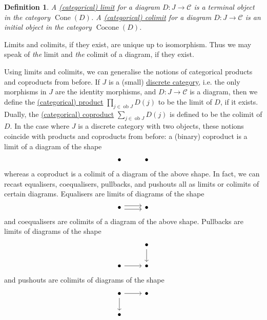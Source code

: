 \documentclass[a4paper,11pt]{article}
\theoremstyle{break_italics}
\newtheorem*{definition*}{Definition}
\theoremstyle{break_upright}
\theoremstyle{remark}
\newcommand{\ob}{\operatorname{ob}}
\newcommand{\C}{\mathcal{C}}
\begin{document}
\begin{definition*}
A \uline{(categorical) limit} for a diagram $D \colon J \to \C$ is a terminal object in the category $\operatorname{Cone}(D)$. A \uline{(categorical) colimit} for a diagram $D \colon J \to \C$ is an initial object in the category $\operatorname{Cocone}(D)$.	
\end{definition*}

Limits and colimits, if they exist, are unique up to isomorphism. Thus we may speak of \textit{the} limit and \textit{the} colimit of a diagram, if they exist.

Using limits and colimits, we can generalise the notions of categorical products and coproducts from before. If $J$ is a (small) \uline{discrete category}, i.e. the only morphisms in $J$ are the identity morphisms, and $D \colon J \to \C$ is a diagram, then we define the \uline{(categorical) product} $\prod_{j\in\ob J} D(j)$ to be the limit of $D$, if it exists. Dually, the \uline{(categorical) coproduct} $\sum_{j\in\ob J} D(j)$ is defined to be the colimit of $D$. In the case where $J$ is a discrete category with two objects, these notions coincide with products and coproducts from before: a (binary) coproduct is a limit of a diagram of the shape
\[
	\begin{tikzcd}
	\bullet & \bullet
\end{tikzcd}
\]
whereas a coproduct is a colimit of a diagram of the above shape. In fact, we can recast equalisers, coequalisers, pullbacks, and pushouts all as limits or colimits of certain diagrams. Equalisers are limits of diagrams of the shape
\[
\begin{tikzcd}
	\bullet & \bullet
	\arrow[shift left, from=1-1, to=1-2]
	\arrow[shift right, from=1-1, to=1-2]
\end{tikzcd}
\]
and coequalisers are colimits of a diagram of the above shape. Pullbacks are limits of diagrams of the shape
\[
\begin{tikzcd}
	& \bullet \\
	\bullet & \bullet
	\arrow[from=1-2, to=2-2]
	\arrow[from=2-1, to=2-2]
\end{tikzcd}
\]
and pushouts are colimits of diagrams of the shape
\[
\begin{tikzcd}
	\bullet & \bullet \\
	\bullet
	\arrow[from=1-1, to=1-2]
	\arrow[from=1-1, to=2-1]
\end{tikzcd}
\]
\end{document}
